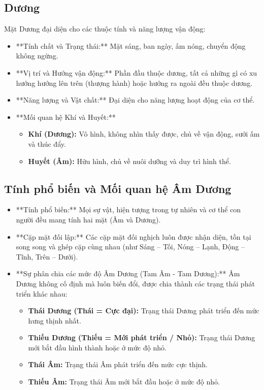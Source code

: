 \subsection{Dương}
Mặt Dương đại diện cho các thuộc tính và năng lượng vận động:
\begin{itemize}
    \item **Tính chất và Trạng thái:** Mặt sáng, ban ngày, ấm nóng, chuyển động không ngừng.
    \item **Vị trí và Hướng vận động:** Phần đầu thuộc dương, tất cả những gì có xu hướng hướng lên trên (thượng hành) hoặc hướng ra ngoài đều thuộc dương.
    \item **Năng lượng và Vật chất:** Đại diện cho năng lượng hoạt động của cơ thể. 
    \item **Mối quan hệ Khí và Huyết:** 
    \begin{itemize}
        \item \textbf{Khí (Dương):} Vô hình, không nhìn thấy được, chủ về vận động, sưởi ấm và thúc đẩy.
        \item \textbf{Huyết (Âm):} Hữu hình, chủ về nuôi dưỡng và duy trì hình thể.
    \end{itemize}
\end{itemize}

\subsection{Tính phổ biến và Mối quan hệ Âm Dương}
\begin{itemize}
    \item **Tính phổ biến:** Mọi sự vật, hiện tượng trong tự nhiên và cơ thể con người đều mang tính hai mặt (Âm và Dương).
    \item **Cặp mặt đối lập:** Các cặp mặt đối nghịch luôn được nhận diện, tồn tại song song và ghép cặp cùng nhau (như Sáng -- Tối, Nóng -- Lạnh, Động -- Tĩnh, Trên -- Dưới).
    \item **Sự phân chia các mức độ Âm Dương (Tam Âm - Tam Dương):**
    Âm Dương không cố định mà luôn biến đổi, được chia thành các trạng thái phát triển khác nhau:
    \begin{itemize}
        \item \textbf{Thái Dương (Thái = Cực đại):} Trạng thái Dương phát triển đến mức hưng thịnh nhất.
        \item \textbf{Thiếu Dương (Thiếu = Mới phát triển / Nhỏ):} Trạng thái Dương mới bắt đầu hình thành hoặc ở mức độ nhỏ.
        \item \textbf{Thái Âm:} Trạng thái Âm phát triển đến mức cực thịnh.
        \item \textbf{Thiếu Âm:} Trạng thái Âm mới bắt đầu hoặc ở mức độ nhỏ.
    \end{itemize}
\end{itemize}

